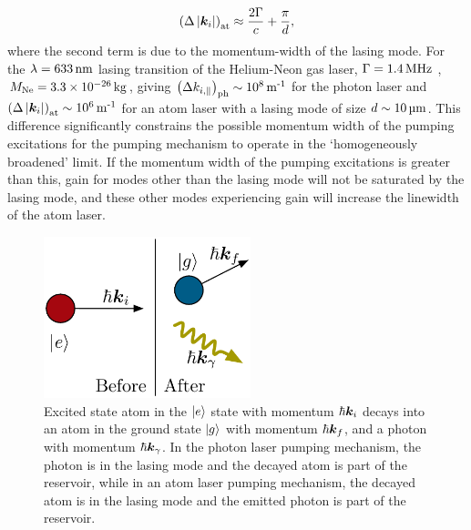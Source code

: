 \begin{align*}
    \left(\Delta \left|\bm{k}_{i}\right|\right)_\text{at} \approx \frac{2 \Gamma}{c} + \frac{\pi}{d},
\end{align*}
where the second term is due to the momentum-width of the lasing mode.  For the $\lambda = \unit[633]{nm}$ lasing transition of the Helium-Neon gas laser, $\Gamma = \unit[1.4]{MHz}$ \citep[Table~13.2-1]{SalehTeich}, $M_\text{Ne} = 3.3 \times \unit[10^{-26}]{kg}$, giving $\left(\Delta k_{i,\parallel}\right)_\text{ph} \sim \unit[10^8]{m\textsuperscript{-1}}$ for the photon laser and $\left(\Delta \abs{\vect{k}_{i}}\right)_\text{at} \sim \unit[10^{6}]{m\textsuperscript{-1}}$ for an atom laser with a lasing mode of size $d \sim \unit[10]{\micro m}$.  This difference significantly constrains the possible momentum width of the pumping excitations for the pumping mechanism to operate in the `homogeneously broadened' limit.  If the momentum width of the pumping excitations is greater than this, gain for modes other than the lasing mode will not be saturated by the lasing mode, and these other modes experiencing gain will increase the linewidth of the atom laser.  

\begin{figure}
    \centering
    \includegraphics[width=6cm]{AtomDecay}
    \caption{
        \label{Introduction:AtomDecay}
        Excited state atom in the ${\left|e\right>}$ state with momentum $\hbar \bm{k}_i$ decays into an atom in the ground state ${\left|g\right>}$ with momentum $\hbar \bm{k}_f$, and a photon with momentum $\hbar \bm{k}_\gamma$.  In the photon laser pumping mechanism, the photon is in the lasing mode and the decayed atom is part of the reservoir, while in an atom laser pumping mechanism, the decayed atom is in the lasing mode and the emitted photon is part of the reservoir.
    }
\end{figure}

